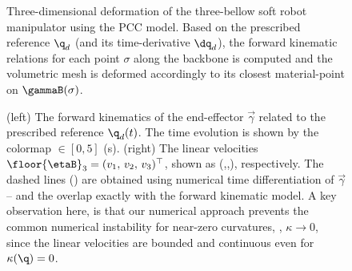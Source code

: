 \begin{figure}[!h]
   \centering
   \vspace{-2mm}
   
   \caption{Three-dimensional deformation of the three-bellow soft robot manipulator using the PCC model. Based on the prescribed reference $\q_d$ (and its time-derivative $\dq_d$), the forward kinematic relations for each point $\sigma$ along the backbone is computed and the volumetric mesh is deformed accordingly to its closest material-point on $\gammaB(\sigma)$.}
   \vspace{-0.1cm}
   \label{fig:C2:EX1:strain_ref_3D}
 \end{figure}
 \begin{figure}[!t]
  \pgfplotsset{colormap name=barney}
  
  \caption{(left) The forward kinematics of the end-effector $\vec{\gamma}$ related to the prescribed reference $\q_d(t)$. The time evolution is shown by the colormap \protect{}$\!\!\in [0,5]$ (s). (right) The linear velocities $\floor{\etaB}_3 = (v_1,\,v_2,\,v_3)^\top$, shown as (,,), respectively. The dashed lines () are obtained using numerical time differentiation of $\vec{\gamma}$ -- and the overlap exactly with the forward kinematic model. A key observation here, is that our numerical approach prevents the common numerical instability for near-zero curvatures, \ie, $\kappa \to 0$, since the linear velocities are bounded and continuous even for $\kappa(\q) = 0$. }
  \label{fig:C2:EX1:strain_ref_FK}
\end{figure}
\clearpage

